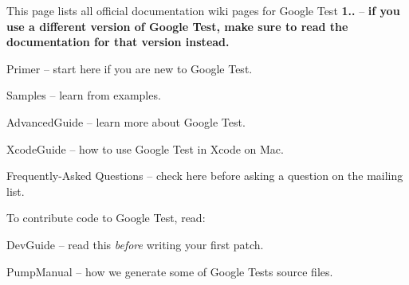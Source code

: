 This page lists all official documentation wiki pages for Google Test {\bfseries{1..}} -- {\bfseries{if you use a different version of Google Test, make sure to read the documentation for that version instead.}}


\begin{DoxyItemize}
\item Primer -- start here if you are new to Google Test.
\item Samples -- learn from examples.
\item Advanced\+Guide -- learn more about Google Test.
\item Xcode\+Guide -- how to use Google Test in Xcode on Mac.
\item Frequently-\/\+Asked Questions -- check here before asking a question on the mailing list.
\end{DoxyItemize}

To contribute code to Google Test, read\+:


\begin{DoxyItemize}
\item Dev\+Guide -- read this {\itshape before} writing your first patch.
\item Pump\+Manual -- how we generate some of Google Test\textquotesingle{}s source files. 
\end{DoxyItemize}
